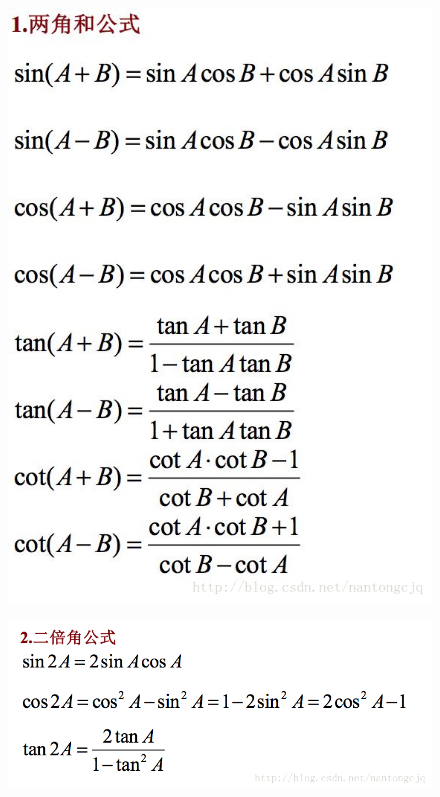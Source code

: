 \documentclass[a4paper,11pt]{article}
\begin{document}
\begin{CJK}{UTF8}{gbsn}
\begin{figure}[!htb]
\begin{center}
      \end{center}
    \end{figure}
    \begin{figure}[!htb]
      \begin{center}
        \includegraphics[width=0.50\linewidth]{../scoure/12.png}
      \end{center}
    \end{figure}
    \begin{figure}[!htb]
      \begin{center}
        \includegraphics[width=0.50\linewidth]{../scoure/13.png}
      \end{center}
    \end{figure}
\end{CJK}
\end{document}
